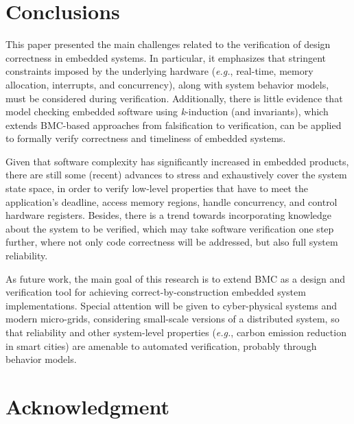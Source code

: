 \documentclass{acm_sen_article}
\begin{document}


\section{Conclusions}
\label{conclusions}

This paper presented the main challenges related to the verification of design correctness in embedded systems. In particular, it emphasizes that stringent constraints imposed by the underlying hardware ({\it e.g.}, real-time, memory allocation, interrupts, and concurrency), along with system behavior models, must be considered during verification. Additionally, there is little evidence that model checking embedded software using \textit{k}-induction (and invariants), which
extends BMC-based approaches from falsification to verification, can be applied to formally verify correctness and timeliness of embedded systems. 

Given that software complexity has significantly increased in embedded products, there are still some (recent) advances to stress and exhaustively cover the system state space, in order to verify low-level properties that have to meet the application's deadline, access memory regions, handle concurrency, and control hardware registers. Besides, there is a trend towards incorporating knowledge about the system to be verified, which may take software verification one step further, where not only code correctness will be addressed, but also full system reliability. 

As future work, the main goal of this research is to extend BMC as a design and verification tool for achieving correct-by-construction embedded system implementations. Special attention will be given to cyber-physical systems and modern micro-grids, considering small-scale versions of a distributed system, so that reliability and other system-level properties ({\it e.g.}, carbon emission reduction in smart cities) are amenable to automated verification, probably through behavior models.





\section*{Acknowledgment}
\end{document}
